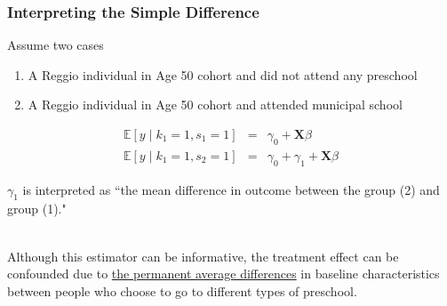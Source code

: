 \documentclass{beamer}
\begin{document}
\begin{frame} \frametitle{Interpreting the Simple Difference}

Assume two cases
\begin{enumerate}
\item A Reggio individual in Age 50 cohort and did not attend any preschool
\item A Reggio individual in Age 50 cohort and attended municipal school
\end{enumerate}
\begin{eqnarray*}  
    \mathbb{E}[y \mid k_1 = 1, s_1 = 1] & = & \gamma_0 + \mathbf{X}\beta  \\
    \mathbb{E}[y \mid k_1 = 1, s_2 = 1] & = & \gamma_0 + \gamma_1 + \mathbf{X}\beta      
\end{eqnarray*}

$\gamma_1$ is interpreted as ``the mean difference in outcome between the group (2) and group (1)." \\\

Although this estimator can be informative, the treatment effect can be confounded due to \underline{the permanent average differences} in baseline characteristics between people who choose to go to different types of preschool.

\end{frame}
\end{document}
